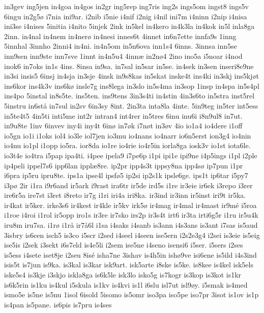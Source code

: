 {in3gev
ing5jen
in4goa
in4gos
in2gr
ing5rep
ing7ris
ing2s
ings5om
ingst8
ings5v
6ingu
in2g5^^f8
i7nia
ini9ar.
i2nib
i5nie
i4nif
i2nig
i4nil
ini7m
i4ninn
i2nip
i4nisa
ini3se
i4nises
5initia
i4nito
5injek
2ink
in5kel
in4kero
in4k3la
in4kok
in5l
inla8ga
2inn.
in4nal
in4nem
in4ner^^f8
in4nesi
innes6t
4innet
in6n7ette
innfa9s
1inng
5innhal
3innho
2inni4
in4ni.
in4n5om
in5n6ova
inn1s4
6inns.
3innsa
inn5se
inn9sen
inn9ste
inn7sve
1innt
in4n5u4
4inn^^e6
in2n^^f84
2ino
ino5a
i5noar
i4nod
inok6
in7oks
in1s
4ins.
8insa
in9sa.
in7sal
in5sar
in5se.
in4sek
in3sen
inseri8e9ne
in3si
insis5
6insj
in4sja
in3sje
4insk
in9s8kas
in5skat
inske4t
ins4ki
in3skj
ins5kj^^f8t
ins6kor
ins4k3v
ins6k^^f8
insle7g
ins8lega
in3slo
in5s4ma
in3sop
1insp
in4spa
in5s4pl
ins4po
5instal
in8s5te.
ins5ten.
ins9tens
3in3s4ti
in4stin
4in3s6to
in5stra
inst5rel
5instru
in6st^^e5
in7sul
in2sv
6in3sy
8int.
2in3ta
inta8la
4inte.
5in9teg
in5ter
int5ess
in5te4t5
4in5ti
inti5me
int2r
intran4
int4rer
in5tres
6inu
inu6i
i8n9ul8
in7ut.
in9u8te
1inv
6invev
iny4i
iny4t
6in^^f8
in7^^f8k
i7n^^f8t
in3^^f8v
4io
io1a4
io4dere
i1off
io5gn
io1i
i1oks
iol4
io3le
iol7jen
io3mu
io4nans
io4narr
io6n5erst
ion3g4
io4nin
io4nu
io1pl
i1opp
io5ra.
ior8da
io1re
io4rie
io4r5in
iorla8ga
iosk3v
io1st
iota6le.
io3t4e
io4tra
i5pap
ipa4ti.
i4pee
ipela9
i7pe6p
i1pi
ipi1e
ipi9ne
i4p5ings
i1pl
i2ple
ip4peli
ippel7s6
ipp6lan
ippl^^e68re.
ip2pr
ipp4s3t
ippsy8na
ipp4s^^f8
ip7pun
i1pr
i6pra
ip5ru
ipru8te.
ips1a
ipse4l
ipsf^^f85
ip2si
ip2s1k
ipsle6ge.
ips1t
ip6tar
i5py7
i3p^^f8
2ir
i1ra
i9r6and
ir5ark
i9rast
ira6tr
ir5de
ird5s
i1re
ir3eie
ir6ek
i3repo
i3rer
ire6r5a
ire7st
i3ret
i8reto
ir7g
i1ri
iri4a
iri8ka.
ir3ind
ir3inn
ir5inst
iri9t
ir5ka.
ir4kat
ir5ker.
irke3s6
ir4kest
ir4kle
ir5kv
irk5^^f8
ir4mag
ir4mal
ir4mast
ir9m^^e9
i5roa
i1roe
i4roi
i1rol
ir5opp
iro1s
ir3re
ir7sko
irs2p
ir3s4t
irt6
ir3ta
irti6g5r
i1ru
ir5u4k
iru8m
iru7sa.
i1r^^f8
i1r^^e5
ir7^^e56l
i1sa
i4saks
i4sanb
is3ann
i4s3ans
is3ant
i7sas
is5aud
3isbry
is6cen
isch5
is3co
i5scr
i2sed
i4seel
i4seen
ise5ern
i2s2e3g4
i2sei
is3eie
is5eig
ise5is
i2sek
i3sekt
i6s7eld
is4e5li
i2sem
ise5ne
i4seno
isensi6
i5ser.
i5sers
i2ses
is5ess
i4sete
iset8je
i2seu
8is^^e9
isha7ne
3ishav
is4h5in
ish^^f89ve
isi6ene
is5ild
i4s3ind
isis5t
is7jun
is9ka.
is3kal
is3kar
isk9art.
isk5arte
i8ske
is5ke.
is8kee
is4kel
isk5els
iske5s4
is3kje
i3skjo
iskla8ga
is6k5le
isk3lo
isko5g
is7kogr
is3kop
is3kot
is1kr
is6k5rin
is1ku
is4kul
i5skula
is1kv
is4kvi
is1l
i6slu
isl7ut
isl9^^f8y.
i5smak
is4med
ismo5e
is5ne
is5nu
1isol
6isold
5isomo
is5omr
iso3pa
iso5pe
iso7pr
3isot
is1ov
is1p
is4pan
is5pane.
is6pis
is7pru
is4ses
}
